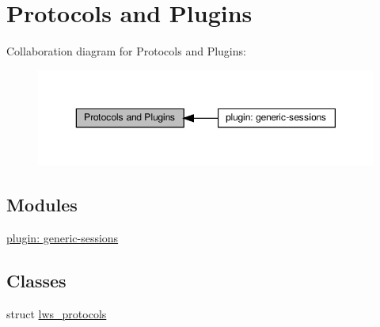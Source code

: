 \hypertarget{group__Protocols-and-Plugins}{}\section{Protocols and Plugins}
\label{group__Protocols-and-Plugins}
Collaboration diagram for Protocols and Plugins\+:
\nopagebreak
\begin{figure}[H]
\begin{center}
\leavevmode
\includegraphics[width=350pt]{group__Protocols-and-Plugins}
\end{center}
\end{figure}
\subsection*{Modules}
\begin{DoxyCompactItemize}
\item 
\hyperlink{group__generic-sessions}{plugin\+: generic-\/sessions}
\end{DoxyCompactItemize}
\subsection*{Classes}
\begin{DoxyCompactItemize}
\item 
struct \hyperlink{structlws__protocols}{lws\+\_\+protocols}
\end{DoxyCompactItemize}
